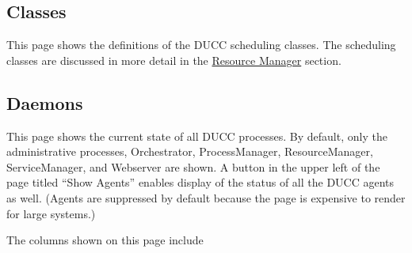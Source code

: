 \subsection{Classes}
This page shows the definitions of the DUCC scheduling classes.  The scheduling classes are
discussed in more detail in the \hyperref[sec:rm.job-classes]{Resource Manager} section.

\subsection{Daemons}
\label{sec:system-details.daemons}

This page shows the current state of all DUCC processes.  By default, only the administrative
processes, Orchestrator, ProcessManager, ResourceManager, ServiceManager, and Webserver are
shown.  A button in the upper left of the page titled ``Show Agents'' enables display of
the status of all the DUCC agents as well. (Agents are suppressed by default because the
page is expensive to render for large systems.)

The columns shown on this page include

